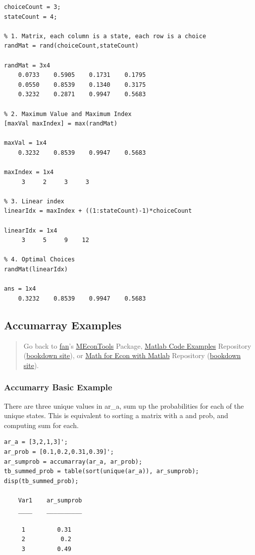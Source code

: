 \documentclass[
]{book}
\begin{document}
\begin{verbatim}
choiceCount = 3;
stateCount = 4;

% 1. Matrix, each column is a state, each row is a choice
randMat = rand(choiceCount,stateCount)

randMat = 3x4    
    0.0733    0.5905    0.1731    0.1795
    0.0550    0.8539    0.1340    0.3175
    0.3232    0.2871    0.9947    0.5683

% 2. Maximum Value and Maximum Index
[maxVal maxIndex] = max(randMat)

maxVal = 1x4    
    0.3232    0.8539    0.9947    0.5683

maxIndex = 1x4    
     3     2     3     3

% 3. Linear index
linearIdx = maxIndex + ((1:stateCount)-1)*choiceCount

linearIdx = 1x4    
     3     5     9    12

% 4. Optimal Choices
randMat(linearIdx)

ans = 1x4    
    0.3232    0.8539    0.9947    0.5683
\end{verbatim}

\hypertarget{accumarray-examples}{%
\subsection{Accumarray Examples}\label{accumarray-examples}}

\begin{quote}
Go back to \href{http://fanwangecon.github.io/}{fan}'s \href{https://fanwangecon.github.io/MEconTools/}{MEconTools} Package, \href{https://fanwangecon.github.io/M4Econ/}{Matlab Code Examples} Repository (\href{https://fanwangecon.github.io/M4Econ/bookdown}{bookdown site}), or \href{https://fanwangecon.github.io/Math4Econ/}{Math for Econ with Matlab} Repository (\href{https://fanwangecon.github.io/Math4Econ/bookdown}{bookdown site}).
\end{quote}

\hypertarget{accumarry-basic-example}{%
\subsubsection{Accumarry Basic Example}\label{accumarry-basic-example}}

There are three unique values in ar\_a, sum up the probabilities for
each of the unique states. This is equivalent to sorting a matrix with a
and prob, and computing sum for each.

\begin{verbatim}
ar_a = [3,2,1,3]';
ar_prob = [0.1,0.2,0.31,0.39]';
ar_sumprob = accumarray(ar_a, ar_prob);
tb_summed_prob = table(sort(unique(ar_a)), ar_sumprob);
disp(tb_summed_prob);

    Var1    ar_sumprob
    ____    __________

     1         0.31   
     2          0.2   
     3         0.49   
\end{verbatim}
\end{document}
